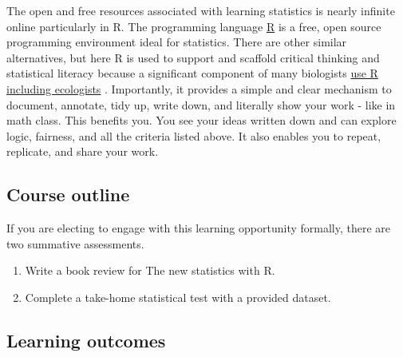 \documentclass[
]{book}
\providecommand{\tightlist}{%
  \setlength{\itemsep}{0pt}\setlength{\parskip}{0pt}}
\begin{document}
The open and free resources associated with learning statistics is nearly infinite online particularly in R. The programming language \href{https://www.r-project.org}{R} is a free, open source programming environment ideal for statistics. There are other similar alternatives, but here R is used to support and scaffold critical thinking and statistical literacy because a significant component of many biologists \href{https://esajournals.onlinelibrary.wiley.com/doi/full/10.1002/ecs2.2567}{use R including ecologists} \citep{RN6098}. Importantly, it provides a simple and clear mechanism to document, annotate, tidy up, write down, and literally show your work - like in math class. This benefits you. You see your ideas written down and can explore logic, fairness, and all the criteria listed above. It also enables you to repeat, replicate, and share your work.

\hypertarget{course-outline}{%
\subsection*{Course outline}\label{course-outline}}

If you are electing to engage with this learning opportunity formally, there are two summative assessments.

\begin{enumerate}
\def\labelenumi{\arabic{enumi}.}
\tightlist
\item
  Write a book review for The new statistics with R.\\
\item
  Complete a take-home statistical test with a provided dataset.
\end{enumerate}

\hypertarget{learning-outcomes}{%
\subsection*{Learning outcomes}\label{learning-outcomes}}
\end{document}
